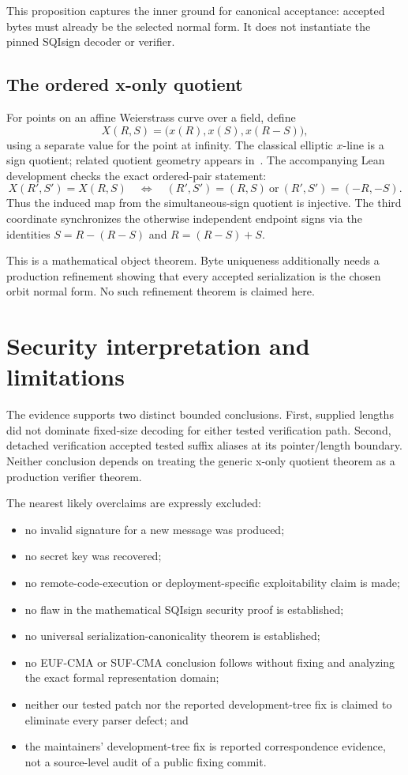 \documentclass[11pt]{article}
\begin{document}
This proposition captures the inner ground for canonical acceptance: accepted
bytes must already be the selected normal form.  It does not instantiate the
pinned SQIsign decoder or verifier.

\subsection{The ordered x-only quotient}

For points on an affine Weierstrass curve over a field, define
\[
  X(R,S)=\bigl(x(R),x(S),x(R-S)\bigr),
\]
using a separate value for the point at infinity.  The classical elliptic
$x$-line is a sign quotient; related quotient geometry appears
in~\cite{costello-smith-2017,kohel-2016}.  The accompanying Lean development
checks the exact ordered-pair statement:
\[
  X(R',S')=X(R,S)
  \quad\Longleftrightarrow\quad
  (R',S')=(R,S)\ \text{or}\ (R',S')=(-R,-S).
\]
Thus the induced map from the simultaneous-sign quotient is injective.  The
third coordinate synchronizes the otherwise independent endpoint signs via
the identities $S=R-(R-S)$ and $R=(R-S)+S$.

This is a mathematical object theorem.  Byte uniqueness additionally needs a
production refinement showing that every accepted serialization is the chosen
orbit normal form.  No such refinement theorem is claimed here.

\section{Security interpretation and limitations}

The evidence supports two distinct bounded conclusions.  First, supplied
lengths did not dominate fixed-size decoding for either tested verification
path.  Second, detached verification accepted tested suffix aliases at its
pointer/length boundary.  Neither conclusion depends on treating the generic
x-only quotient theorem as a production verifier theorem.

The nearest likely overclaims are expressly excluded:

\begin{itemize}
  \item no invalid signature for a new message was produced;
  \item no secret key was recovered;
  \item no remote-code-execution or deployment-specific exploitability claim
        is made;
  \item no flaw in the mathematical SQIsign security proof is established;
  \item no universal serialization-canonicality theorem is established;
  \item no EUF-CMA or SUF-CMA conclusion follows without fixing and analyzing
        the exact formal representation domain;
  \item neither our tested patch nor the reported development-tree fix is
        claimed to eliminate every parser defect; and
  \item the maintainers' development-tree fix is reported correspondence
        evidence, not a source-level audit of a public fixing commit.
\end{itemize}
\end{document}
